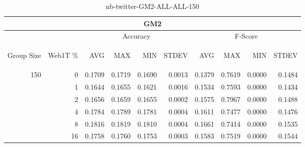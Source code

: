 \begin{center}
\begin{table}[htbp]
\begin{center}
\begin{tabular}{ | r | r | r | r | r | r | r | r | r | r |}
\hline
\multicolumn{10}{|c|}{GM2}\\
\hline
 & & \multicolumn{4}{|c|}{Accuracy} & \multicolumn{4}{|c|}{F-Score}\\ \cline{3-10}
\begin{sideways}Group Size\end{sideways} & \begin{sideways}Web1T \%\end{sideways} & \begin{sideways}AVG\end{sideways} & \begin{sideways}MAX\end{sideways} & \begin{sideways}MIN\end{sideways} & \begin{sideways}STDEV\end{sideways} & \begin{sideways}AVG\end{sideways} & \begin{sideways}MAX\end{sideways} & \begin{sideways}MIN\end{sideways} & \begin{sideways}STDEV\end{sideways}\\
\hline
\multirow{5}{*}{150}
 & 0 & 0.1709 & 0.1719 & 0.1690 & 0.0013 & 0.1379 & 0.7619 & 0.0000 & 0.1484\\ \cline{2-10}
 & 1 & 0.1644 & 0.1655 & 0.1621 & 0.0016 & 0.1534 & 0.7593 & 0.0000 & 0.1434\\ \cline{2-10}
 & 2 & 0.1656 & 0.1659 & 0.1655 & 0.0002 & 0.1575 & 0.7967 & 0.0000 & 0.1488\\ \cline{2-10}
 & 4 & 0.1784 & 0.1789 & 0.1781 & 0.0004 & 0.1611 & 0.7477 & 0.0000 & 0.1476\\ \cline{2-10}
 & 8 & 0.1816 & 0.1819 & 0.1810 & 0.0004 & 0.1661 & 0.7414 & 0.0000 & 0.1535\\ \cline{2-10}
 & 16 & 0.1758 & 0.1760 & 0.1753 & 0.0003 & 0.1583 & 0.7519 & 0.0000 & 0.1544\\ \cline{2-10}
\hline
\end{tabular}
\caption{nb-twitter-GM2-ALL-ALL-150}
\label{table:nb-twitter-GM2-ALL-ALL-150}
\end{center}
\end{table}
\end{center}

